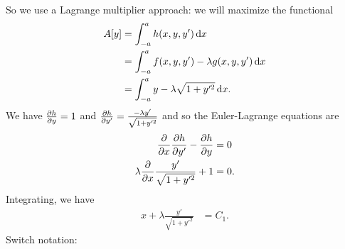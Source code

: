 So we use a Lagrange multiplier approach: we will maximize the functional
\begin{align*}
  A[y]
  &= \int_{-a}^{a} h(x, y, y') \dx \\
  &= \int_{-a}^{a} f(x, y, y') - \lambda g(x, y, y') \dx \\
  &= \int_{-a}^{a} y - \lambda \sqrt{1 + y'^2} \dx.
\end{align*}
We have $\frac{\partial h}{\partial y} = 1$ and $\frac{\partial h}{\partial y'} = \frac{-\lambda y'}{\sqrt{1 + y'^2}}$ and so the Euler-Lagrange equations are
\begin{align*}
  \frac{\partial}{\partial x} \frac{\partial h}{\partial y'} - \frac{\partial h}{\partial y} &= 0 \\
  \lambda \frac{\partial}{\partial x} \frac{y'}{\sqrt{1 + y'^2}} + 1 &= 0.
\end{align*}
Integrating, we have
\begin{align*}
  x + \lambda \frac{y'}{\sqrt{1 + y'^2}} &= C_1.
\end{align*}
Switch notation:

